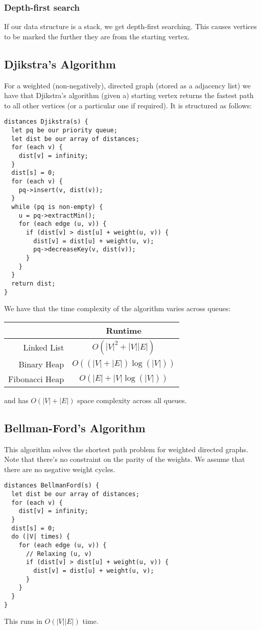 \documentclass[a4paper, 12pt, twoside]{article}
\begin{document}
\subsubsection{Depth-first search}

If our data structure is a stack, we get depth-first searching.
This causes vertices to be marked the further they are from
the starting vertex.

\subsection{Djikstra's Algorithm}

For a weighted (non-negatively), directed graph (stored as a
adjacency list) we have that Djikstra's algorithm (given a)
starting vertex returns the fastest path to all other vertices 
(or a particular one if required). It is structured as follows:
\begin{lstlisting}
distances Djikstra(s) {
  let pq be our priority queue;
  let dist be our array of distances;
  for (each v) {
    dist[v] = infinity;
  }
  dist[s] = 0;
  for (each v) {
    pq->insert(v, dist(v));
  }
  while (pq is non-empty) {
    u = pq->extractMin();
    for (each edge (u, v)) {
      if (dist[v] > dist[u] + weight(u, v)) {
        dist[v] = dist[u] + weight(u, v);
        pq->decreaseKey(v, dist(v));
      }
    }
  }
  return dist;
}
\end{lstlisting} We have that the time complexity of the algorithm
varies across queues: \begin{center}
  \begin{tabular} {| r || c |}
    \hline
    & Runtime \\
    \hline \hline
    Linked List & $O(|V|^2 + |V||E|)$ \\
    \hline
    Binary Heap & $O((|V| + |E|)\log{(|V|)})$ \\
    \hline
    Fibonacci Heap & $O(|E| + |V|\log{(|V|)})$ \\
    \hline
  \end{tabular}
\end{center}
and has $O(|V| + |E|)$ space complexity across all queues.

\subsection{Bellman-Ford's Algorithm}

This algorithm solves the shortest path problem for weighted directed graphs.
Note that there's no constraint on the parity of the weights. We assume
that there are no negative weight cycles. \begin{lstlisting}
distances BellmanFord(s) {
  let dist be our array of distances;
  for (each v) {
    dist[v] = infinity;
  }
  dist[s] = 0;
  do (|V| times) {
    for (each edge (u, v)) {
      // Relaxing (u, v)
      if (dist[v] > dist[u] + weight(u, v)) {
        dist[v] = dist[u] + weight(u, v);
      }
    }
  }
}
\end{lstlisting} This runs in $O(|V||E|)$ time.
\end{document}
